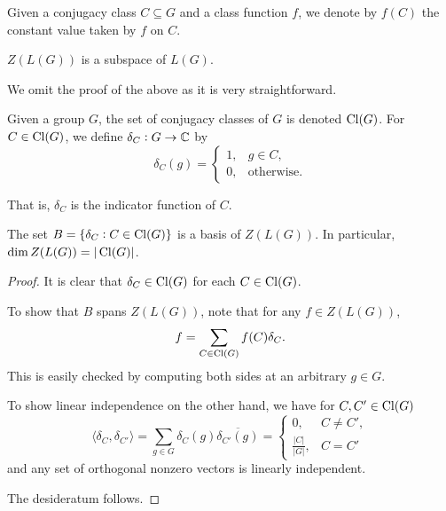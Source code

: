		Given a conjugacy class $C \subseteq G$ and a class function $f$, we denote by $f(C)$ the constant value taken by $f$ on $C$.

		\begin{prop}
			$Z(L(G))$ is a subspace of $L(G)$.
		\end{prop}
		We omit the proof of the above as it is very straightforward.

		\begin{fdef}
			Given a group $G$, the set of conjugacy classes of $G$ is denoted $\operatorname{Cl}(G)$. For $C \in \operatorname{Cl}(G)$, we define $\delta_C : G \to \mathbb{C}$ by
			\[ \delta_C(g) = \begin{cases} 1, & g \in C, \\ 0, & \text{otherwise.} \end{cases} \]
		\end{fdef}

		That is, $\delta_C$ is the indicator function of $C$.

		\begin{fprop}
			The set $B = \{ \delta_C : C \in \operatorname{Cl}(G) \}$ is a basis of $Z(L(G))$. In particular, $\dim Z(L(G)) = |\operatorname{Cl}(G)|$.
		\end{fprop}
		\begin{proof}
			It is clear that $\delta_C \in \operatorname{Cl}(G)$ for each $C \in \operatorname{Cl}(G)$.

			To show that $B$ spans $Z(L(G))$, note that for any $f \in Z(L(G))$,
			\[ f = \sum_{C \in \operatorname{Cl}(G)} f(C) \delta_C. \]
			This is easily checked by computing both sides at an arbitrary $g \in G$.

			To show linear independence on the other hand, we have for $C,C' \in \operatorname{Cl}(G)$
			\[ \langle \delta_C , \delta_{C'} \rangle = \sum_{g \in G} \delta_C(g) \overline{\delta_{C'}(g)} = \begin{cases} 0 , & C \ne C', \\ \frac{|C|}{|G|}, & C = C' \end{cases} \]
			and any set of orthogonal nonzero vectors is linearly independent.

			The desideratum follows.
		\end{proof}

